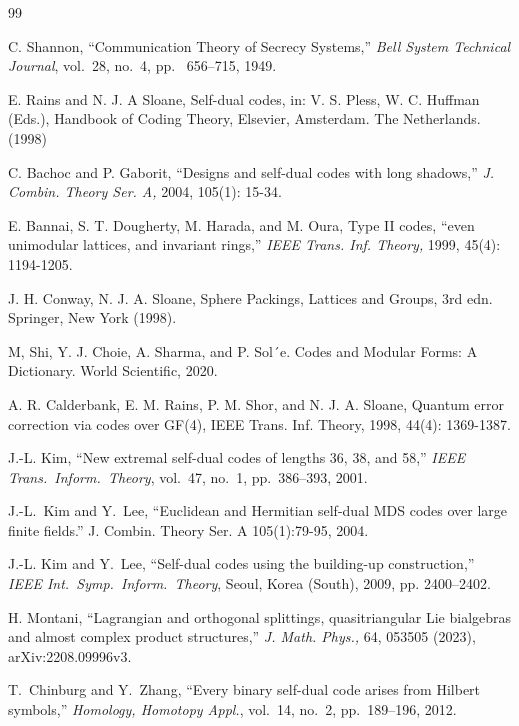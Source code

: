 \documentclass[12pt]{article}
\begin{document}

\begin{thebibliography}{99}

C. Shannon, ``Communication Theory of Secrecy Systems,'' \textit{Bell System Technical Journal}, vol.~28, no.~4, pp.~ 656--715, 1949.

 E. Rains and N. J. A Sloane, Self-dual codes, in: V. S. Pless, W. C. Huffman (Eds.),
Handbook of Coding Theory, Elsevier, Amsterdam. The Netherlands. (1998)


 C. Bachoc and P. Gaborit, ``Designs and self-dual codes with long shadows,'' \textit{J. Combin.
Theory Ser. A,} 2004, 105(1): 15-34.

 E. Bannai, S. T. Dougherty, M. Harada, and M. Oura, Type II codes, ``even unimodular
lattices, and invariant rings,'' \textit{IEEE Trans. Inf. Theory,} 1999, 45(4): 1194-1205.

J. H. Conway, N. J. A. Sloane, Sphere Packings, Lattices and Groups, 3rd edn.
Springer, New York (1998).

 M, Shi, Y. J. Choie, A. Sharma, and P. Sol´e. Codes and Modular Forms: A Dictionary. World Scientific, 2020.

A. R. Calderbank, E. M. Rains, P. M. Shor, and N. J. A. Sloane, Quantum error
correction via codes over GF(4), IEEE Trans. Inf. Theory, 1998, 44(4): 1369-1387.


J.-L. Kim,
``New extremal self-dual codes of lengths 36, 38, and 58,''
\textit{IEEE Trans.\ Inform.\ Theory}, vol.~47, no.~1, pp.~386--393, 2001.

J.-L.~Kim and Y.~Lee, ``Euclidean and Hermitian self-dual MDS codes over large finite fields.'' J. Combin. Theory Ser. A 105(1):79-95, 2004.


J.-L. Kim and Y.~Lee,
``Self-dual codes using the building-up construction,''
\textit{IEEE Int.\ Symp.\ Inform.\ Theory}, Seoul, Korea (South), 2009, pp. 2400--2402.

H. Montani, ``Lagrangian and orthogonal splittings, quasitriangular Lie bialgebras and almost complex product structures,'' \textit{J. Math. Phys.,} 64, 053505 (2023), arXiv:2208.09996v3.


T.~Chinburg and Y.~Zhang,
``Every binary self-dual code arises from Hilbert symbols,''
\textit{Homology, Homotopy Appl.}, vol.~14, no.~2, pp.~189--196, 2012.


\end{thebibliography}
\end{document}
